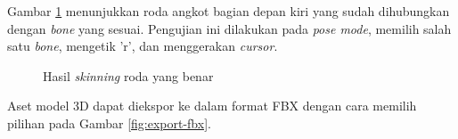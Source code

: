 Gambar \ref{fig:wheel-skinning} menunjukkan roda angkot bagian depan kiri yang
sudah dihubungkan dengan \textit{bone} yang sesuai. Pengujian ini dilakukan pada
\textit{pose mode}, memilih salah satu \textit{bone}, mengetik 'r', dan
menggerakan \textit{cursor}.

\begin{figure}[!h]
	\centering
	\hfill
	\caption{Hasil \textit{skinning} roda yang benar}
	\label{fig:wheel-skinning}
\end{figure}

Aset model 3D dapat diekspor ke dalam format FBX dengan cara memilih pilihan
pada Gambar \ref{fig:export-fbx}.

